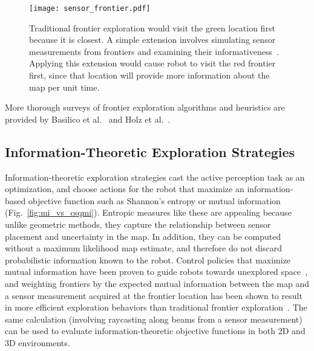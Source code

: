 \begin{figure}[t]
  \centering
  \centering
  \texttt{[image: sensor\_frontier.pdf]}
  \caption[Effects of modeling sensors on frontier exploration.]{Traditional frontier exploration would visit the green location first
    because it is closest. A simple extension involves simulating sensor
    measurements from frontiers and examining their informativeness~\cite{gonzalez2002navigation}. Applying this
    extension would cause robot to visit the red frontier first, since that
    location will provide more information about the map per unit time.\label{fig:sensor_frontier}}
\end{figure}

More thorough surveys of frontier exploration algorithms and heuristics are provided by
Basilico et al.~\cite{basilico2008evaluating} and Holz et al.~\cite{holz2011comparative}.

\subsection{Information-Theoretic Exploration Strategies}

Information-theoretic exploration strategies cast the active perception task as
an optimization, and choose actions for the robot that maximize an information-based objective function such
as Shannon's entropy or mutual
information~\cite{bourgault2002information,kollar2008efficient,charrow2015icra,julian2013mutual}
(Fig.~\ref{fig:mi_vs_csqmi}).
Entropic measures like these are appealing because unlike geometric methods,
they capture the relationship between sensor placement and uncertainty in the
map. In addition, they can be computed without a maximum likelihood map estimate, and
therefore do not discard probabilistic information known to the robot. Control policies
that maximize mutual information have been proven to guide robots
towards unexplored space~\cite{julian2013mutual}, and weighting frontiers by
the expected mutual information between the map and a sensor measurement
acquired at the frontier location has been shown to result in more efficient exploration
behaviors than traditional frontier exploration~\cite{charrow2015icra}.
The same calculation (involving raycasting along beams from a sensor
measurement) can be used to evaluate information-theoretic objective
functions in both 2D and 3D environments.

